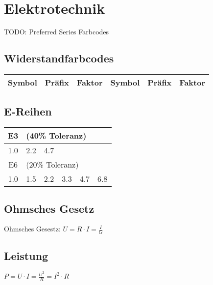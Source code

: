 \section{Elektrotechnik}
	
	TODO: Preferred Series
	Farbcodes


\subsection{Widerstandfarbcodes}
	\begin{emphbox}
		\begin{tabular}{ccl|ccl}
			Symbol & Präfix & Faktor & Symbol & Präfix & Faktor \\
			\hline
			
			
			

		\end{tabular}
	\end{emphbox}
	

\subsection{E-Reihen}
	\begin{emphbox}
		\begin{tabular}{cccccc}
			E3 & \multicolumn{5}{l}{(40\% Toleranz)}  \\
			\hline
			1.0 & 2.2 & 4.7 & & & \\
			E6 & \multicolumn{5}{l}{(20\% Toleranz)}  \\
			\hline
			1.0 & 1.5 & 2.2 & 3.3 & 4.7 & 6.8 \\
	
\end{tabular}


	\end{emphbox}


	
\begin{sectionbox}
	\subsection{Ohmsches Gesetz}

	\begin{emphbox}
	Ohmsches Gesestz: $ U = R \cdot I = \frac{I}{G} $
	\end{emphbox}

	\subsection{Leistung}

	\begin{emphbox}
	$ P = U \cdot I = \frac{U^2}{R} = I^2 \cdot R $
	\end{emphbox}
	

		
\end{sectionbox}


